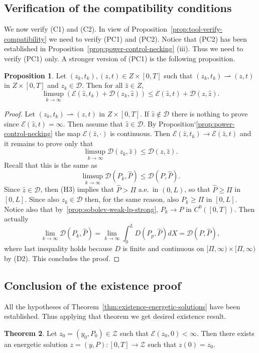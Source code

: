 \documentclass[a4paper,10pt,twoside]{amsbook}
\numberwithin{section}{chapter}
\numberwithin{equation}{chapter}
\theoremstyle{definition}
\newtheorem{prop}{Proposition}[chapter]
\newtheorem{thm}[prop]{Theorem}
\begin{document}
\subsection{Verification of the compatibility conditions}

We now verify (C1) and (C2). In view of Proposition~\ref{prop:tool-verify-compatibility} we need to verify (PC1) and (PC2). Notice that (PC2) has been established in Proposition~\ref{prop:power-control-necking} (iii). Thus we need to verify (PC1) only. A stronger version of (PC1) is the following proposition.
\begin{prop}
Let $(z_k,t_k),(z,t)\in Z\times[0,T]$ such that $(z_k,t_k)\rightharpoonup(z,t)$ in $Z\times[0,T]$ and $z_k\in\mathscr{D}$. Then for all $\hat{z}\in Z$,
\[
\limsup_{k\to\infty}\left(\mathcal{E}(\hat{z},t_k)+\mathcal{D}(z_k,\hat{z})\right)\le\mathcal{E}(\hat{z},t)+\mathcal{D}(z,\hat{z}).
\]
\end{prop}
\begin{proof}
Let $(z_k,t_k)\rightharpoonup (z,t)$ in $Z\times[0,T]$. If $\hat{z}\notin\mathscr{D}$ there is nothing to prove since $\mathcal{E}(\hat{z},t)=\infty$. Then assume that $\hat{z}\in\mathscr{D}$. By Proposition`\eqref{prop:power-control-necking} the map $\mathcal{E}(\hat{z},\cdot)$ is continuous. Then $\mathcal{E}(\hat{z},t_k)\to\mathcal{E}(\hat{z},t)$ and it remains to prove only that
\[
\limsup_{k\to\infty}\mathcal{D}(z_k,\hat{z})\le\mathcal{D}(z,\hat{z}).
\]
Recall that this is the same as
\[
\limsup_{k\to\infty}\mathcal{D}(P_k,\hat{P})\le\mathcal{D}(P,\hat{P}).
\]
Since $\hat{z}\in\mathscr{D}$, then (H3) implies that $\hat{P}>\Pi$ a.e.\ in $(0,L)$, so that $\hat{P}\ge \Pi$ in $[0,L]$. Since also $z_k\in\mathscr{D}$ then, for the same reason, also $P_k\ge \Pi$ in $[0,L]$. Notice also that by~\ref{prop:sobolev-weak-lp-strong}, $P_k\to P$ in $C^0([0,T])$. Then actually
\[
\lim_{k\to\infty}\mathcal{D}(P_k,\hat{P})=\lim_{k\to\infty}\int_0^LD(P_p,\hat{P})dX=\mathcal{D}(P,\hat{P}),
\]
where last inequality holds because $D$ is finite and continuous on $[\Pi,\infty)\times[\Pi,\infty)$ by (D2). This concludes the proof.
\end{proof}

\subsection{Conclusion of the existence proof}

All the hypotheses of Theorem~\ref{thm:existence-energetic-solutions} have been established. Thus applying that theorem we get desired existence result.
\begin{thm}
\label{thm:existence-necking-large}
Let $z_0=(y_0,P_0)\in\mathscr{Z}$ such that $\mathcal{E}(z_0,0)<\infty$. Then there exists an energetic solution $z=(y,P)\colon[0,T]\to\mathscr{Z}$ such that $z(0)=z_0$. 
\end{thm}
\end{document}
